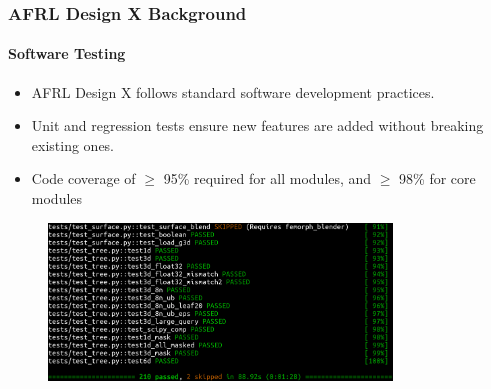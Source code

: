 \documentclass[t]{beamer}
\begin{document}

\begin{frame}
  \frametitle{AFRL Design X Background}
  \framesubtitle{Software Testing}

  \begin{itemize}
  \item AFRL Design X follows standard software development practices.
  \item Unit and regression tests ensure new features are added without breaking existing ones.
  \item Code coverage of $\geq$ 95\% required for all modules, and $\geq$ 98\% for core modules
  \end{itemize}

      \begin{figure}
       \includegraphics[height=1.65in]{./figures/pytest.png}
      \end{figure}

\end{frame}


\end{document}

